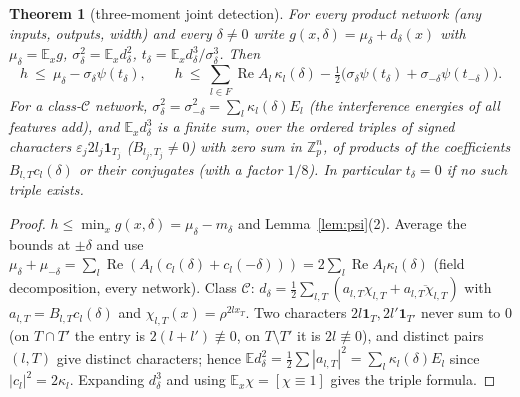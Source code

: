 \documentclass[11pt]{article}
\newtheorem{theorem}{Theorem}
\theoremstyle{remark}
\renewcommand{\Re}{\operatorname{Re}}
\begin{document}
\begin{theorem}[three-moment joint detection]\label{thm:det}
For every product network (any inputs, outputs, width) and every $\delta\neq0$ write $g(x,\delta)=\mu_\delta+d_\delta(x)$ with
$\mu_\delta=\mathbb E_xg$, $\sigma_\delta^2=\mathbb E_xd_\delta^2$, $t_\delta=\mathbb E_xd_\delta^3/\sigma_\delta^3$. Then
\[ h\ \le\ \mu_\delta-\sigma_\delta\psi(t_\delta),\qquad
   h\ \le\ \sum_{l\in F}\Re A_l\,\kappa_l(\delta)-\tfrac12\big(\sigma_\delta\psi(t_\delta)+\sigma_{-\delta}\psi(t_{-\delta})\big).\]
For a class-$\mathcal C$ network, $\sigma_\delta^2=\sigma_{-\delta}^2=\sum_l\kappa_l(\delta)E_l$ (the interference energies of all features
\emph{add}), and $\mathbb E_xd_\delta^3$ is a finite sum, over the ordered triples of signed characters $\varepsilon_j2l_j\mathbf 1_{T_j}$
($B_{l_j,T_j}\neq0$) with zero sum in $\mathbb Z_p^n$, of products of the coefficients $B_{l,T}c_l(\delta)$ or their conjugates (with a
factor $1/8$). In particular $t_\delta=0$ if no such triple exists.
\end{theorem}
\begin{proof}
$h\le\min_xg(x,\delta)=\mu_\delta-m_\delta$ and Lemma~\ref{lem:psi}(2). Average the bounds at $\pm\delta$ and use
$\mu_\delta+\mu_{-\delta}=\sum_l\Re(A_l(c_l(\delta)+c_l(-\delta)))=2\sum_l\Re A_l\kappa_l(\delta)$ (field decomposition, every network).
Class $\mathcal C$: $d_\delta=\frac12\sum_{l,T}(a_{l,T}\chi_{l,T}+\overline{a_{l,T}\chi_{l,T}})$ with $a_{l,T}=B_{l,T}c_l(\delta)$ and
$\chi_{l,T}(x)=\rho^{2lx_T}$. Two characters $2l\mathbf 1_T,2l'\mathbf 1_{T'}$ never sum to $0$ (on $T\cap T'$ the entry is $2(l+l')\not\equiv0$,
on $T\setminus T'$ it is $2l\not\equiv0$), and distinct pairs $(l,T)$ give distinct characters; hence
$\mathbb Ed_\delta^2=\frac12\sum|a_{l,T}|^2=\sum_l\kappa_l(\delta)E_l$ since $|c_l|^2=2\kappa_l$. Expanding $d_\delta^3$ and using
$\mathbb E_x\chi=[\chi\equiv1]$ gives the triple formula.
\end{proof}
\end{document}
